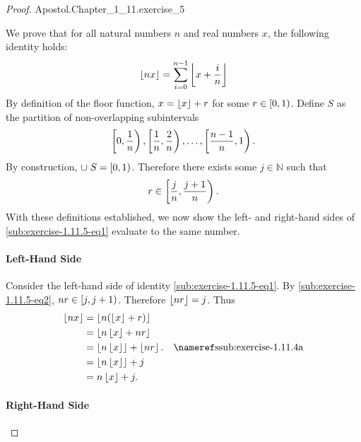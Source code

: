 \documentclass{report}
\begin{document}
\begin{proof}

    {Apostol.Chapter\_1\_11.exercise\_5}

  We prove that for all natural numbers $n$ and real numbers $x$, the following
    identity holds:
    \begin{equation}
      \label{sub:exercise-1.11.5-eq1}
      \left\lfloor nx\right\rfloor = \sum_{i=0}^{n-1} \left\lfloor x + \frac{i}{n}\right\rfloor
    \end{equation}
  By definition of the floor function, $x = \left\lfloor x\right\rfloor + r$ for some
    $r \in \left[0, 1\right)$.
  Define $S$ as the partition of non-overlapping subintervals
    $$\left[0, \frac{1}{n}\right), \left[\frac{1}{n}, \frac{2}{n}\right), \ldots,
      \left[\frac{n-1}{n}, 1\right).$$
  By construction, $\cup\; S = \left[0, 1\right)$.
  Therefore there exists some $j \in \mathbb{N}$ such that
    \begin{equation}
      \label{sub:exercise-1.11.5-eq2}
      r \in \left[\frac{j}{n}, \frac{j+1}{n}\right).
    \end{equation}
  With these definitions established, we now show the left- and right-hand sides
    of \eqref{sub:exercise-1.11.5-eq1} evaluate to the same number.

  \paragraph{Left-Hand Side}%

    Consider the left-hand side of identity \eqref{sub:exercise-1.11.5-eq1}.
    By \eqref{sub:exercise-1.11.5-eq2}, $nr \in \left[j, j + 1\right)$.
    Therefore $\left\lfloor nr\right\rfloor = j$.
    Thus
      \begin{align}
        \floor{nx}
          & = \floor{n(\floor{x} + r)} \nonumber \\
          & = \floor{n\floor{x} + nr} \nonumber \\
          & = \floor{n\floor{x}} + \floor{nr}. \nonumber
            & \textref{ssub:exercise-1.11.4a} \\
          & = \floor{n\floor{x}} + j \nonumber \\
          & = n\floor{x} + j. \label{sub:exercise-1.11.5-eq3}
      \end{align}

  \paragraph{Right-Hand Side}%


\end{proof}
\end{document}
